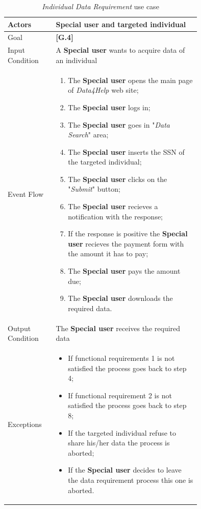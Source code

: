 \begin{center}
\begin{table}[H]
\begin{tabular}{ | l | p{0.75\linewidth} | }
  \hline
    Actors & \textbf{Special user} and targeted individual \\ \hline
    Goal & \textbf{[G.4]} \\ \hline
    Input Condition & A \textbf{Special user} wants to acquire data of an individual \\ \hline
    Event Flow & \begin{minipage}[t]{0.7\textwidth}
      \begin{enumerate}
        \item The \textbf{Special user} opens the main page of \textit{Data4Help} web site;
        \item The \textbf{Special user} logs in;
        \item The \textbf{Special user} goes in "\textit{Data Search}" area;
        \item The \textbf{Special user} inserts the SSN of the targeted individual;
        \item The \textbf{Special user} clicks on the "\textit{Submit}" button;
        \item The \textbf{Special user} recieves a notification with the response;
        \item If the response is positive the \textbf{Special user} recieves the payment form with the amount it has to pay;
        \item The \textbf{Special user} pays the amount due;
        \item The \textbf{Special user} downloads the required data.
      \end{enumerate}
    \smallskip
  \end{minipage} \\ \hline
  Output Condition & The \textbf{Special user} receives the required data \\ \hline
  Exceptions & \begin{minipage}[t]{0.7\textwidth}
    \begin{itemize}
      \smallskip
      \item If functional requirements 1 is not satisfied the process goes back to step 4;
      \item If functional requirement 2 is not satisfied the process goes back to step 8;
      \item If the targeted individual refuse to share his/her data the process is aborted;
      \item If the \textbf{Special user} decides to leave the data requirement process this one is aborted.
    \end{itemize}
    \smallskip
  \end{minipage}  \\ \hline
\end{tabular}
\caption{\textit{Individual Data Requirement} use case}
\label{table:individualDataRequirement}
\end{table}
\end{center}

